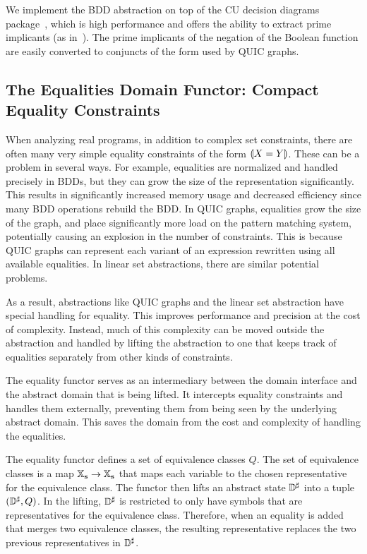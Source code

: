 We implement the BDD abstraction on top of the CU decision diagrams package~\cite{cudd}, which is high performance and offers the ability to extract prime implicants (as in~\cite{prime:mit:92}).  The prime implicants of the negation of the Boolean function are easily converted to conjuncts of the form used by QUIC graphs.

\subsection{The Equalities Domain Functor: Compact Equality Constraints}
\label{s:4:4:eqs}
\newcommand{\eqrep}{\ensuremath{Q}}

When analyzing real programs, in addition to complex set constraints, there are often many very simple equality constraints of the form $\llparenthesis X = Y \rrparenthesis$.  These can be a problem in several ways.  For example, equalities are normalized and handled precisely in BDDs, but they can grow the size of the representation significantly.  This results in significantly increased memory usage and decreased efficiency since many BDD operations rebuild the BDD.  In QUIC graphs, equalities grow the size of the graph, and place significantly more load on the pattern matching system, potentially causing an explosion in the number of constraints.  This is because QUIC graphs can represent each variant of an expression rewritten using all available equalities.  In linear set abstractions, there are similar potential problems.

As a result, abstractions like QUIC graphs and the linear set abstraction have special handling for equality.  This improves performance and precision at the cost of complexity.  Instead, much of this complexity can be moved outside the abstraction and handled by lifting the abstraction to one that keeps track of equalities separately from other kinds of constraints.

The equality functor serves as an intermediary between the domain interface and the abstract domain that is being lifted.  It intercepts equality constraints and handles them externally, preventing them from being seen by the underlying abstract domain.  This saves the domain from the cost and complexity of handling the equalities.

The equality functor defines a set of equivalence classes $\eqrep$.  The set of equivalence classes is a map $\mathbb{X}_{\bf s} \rightarrow \mathbb{X}_{\bf s}$ that maps each variable to the chosen representative for the equivalence class.  The functor then lifts an abstract state ${\mathbb{D}}^{\sharp}$ into a tuple $(\adom, \eqrep)$.  In the lifting, ${\mathbb{D}}^{\sharp}$ is restricted to only have symbols that are representatives for the equivalence class.  Therefore, when an equality is added that merges two equivalence classes, the resulting representative replaces the two previous representatives in ${\mathbb{D}}^{\sharp}$.

